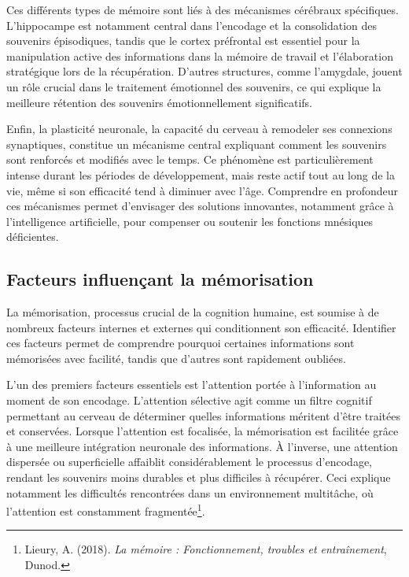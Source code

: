 \documentclass[12pt,a4paper]{report}
\begin{document}
Ces différents types de mémoire sont liés à des mécanismes cérébraux spécifiques. L'hippocampe est notamment central dans l'encodage et la consolidation des souvenirs épisodiques, tandis que le cortex préfrontal est essentiel pour la manipulation active des informations dans la mémoire de travail et l’élaboration stratégique lors de la récupération. D'autres structures, comme l'amygdale, jouent un rôle crucial dans le traitement émotionnel des souvenirs, ce qui explique la meilleure rétention des souvenirs émotionnellement significatifs.

Enfin, la plasticité neuronale, la capacité du cerveau à remodeler ses connexions synaptiques, constitue un mécanisme central expliquant comment les souvenirs sont renforcés et modifiés avec le temps. Ce phénomène est particulièrement intense durant les périodes de développement, mais reste actif tout au long de la vie, même si son efficacité tend à diminuer avec l'âge. Comprendre en profondeur ces mécanismes permet d’envisager des solutions innovantes, notamment grâce à l’intelligence artificielle, pour compenser ou soutenir les fonctions mnésiques déficientes.

\vspace{0.5cm}

\subsection{Facteurs influençant la mémorisation}
La mémorisation, processus crucial de la cognition humaine, est soumise à de nombreux facteurs internes et externes qui conditionnent son efficacité. Identifier ces facteurs permet de comprendre pourquoi certaines informations sont mémorisées avec facilité, tandis que d’autres sont rapidement oubliées.

L’un des premiers facteurs essentiels est l’attention portée à l’information au moment de son encodage. L’attention sélective agit comme un filtre cognitif permettant au cerveau de déterminer quelles informations méritent d’être traitées et conservées. Lorsque l’attention est focalisée, la mémorisation est facilitée grâce à une meilleure intégration neuronale des informations. À l’inverse, une attention dispersée ou superficielle affaiblit considérablement le processus d’encodage, rendant les souvenirs moins durables et plus difficiles à récupérer. Ceci explique notamment les difficultés rencontrées dans un environnement multitâche, où l’attention est constamment fragmentée\footnote{Lieury, A. (2018). \textit{La mémoire : Fonctionnement, troubles et entraînement}, Dunod.}.
\end{document}
